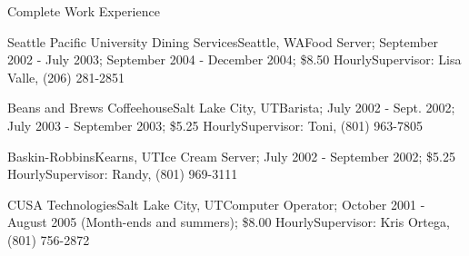 \documentclass[11pt,oneside]{article}
\begin{document}
\begin{ressection}{Complete Work Experience}
    \begin{expsubsec}{Seattle Pacific University Dining Services}{Seattle, WA}{Food Server; September 2002 - July 2003; September 2004 - December 2004; \$8.50 Hourly}{Supervisor: Lisa Valle, (206) 281-2851}
    \end{expsubsec}

    \begin{expsubsec}{Beans and Brews Coffeehouse}{Salt Lake City, UT}{Barista; July 2002 - Sept. 2002; July 2003 - September 2003; \$5.25 Hourly}{Supervisor: Toni, (801) 963-7805}
    \end{expsubsec}

    \begin{expsubsec}{Baskin-Robbins}{Kearns, UT}{Ice Cream Server; July 2002 - September 2002; \$5.25 Hourly}{Supervisor: Randy, (801) 969-3111}
    \end{expsubsec}

    \begin{expsubsec}{CUSA Technologies}{Salt Lake City, UT}{Computer Operator; October 2001 - August 2005 (Month-ends and summers); \$8.00 Hourly}{Supervisor: Kris Ortega, (801) 756-2872}
    \end{expsubsec}

\end{ressection}
\end{document}
